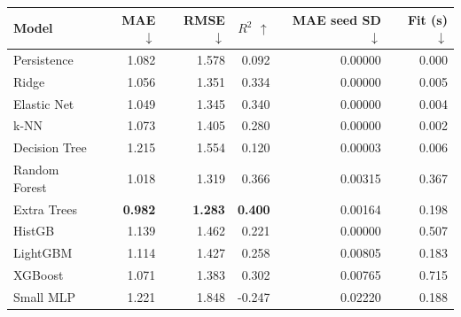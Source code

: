 \begingroup\small\setlength{\tabcolsep}{3pt}
\begin{tabular*}{\linewidth}{@{\extracolsep{\fill}}lrrrrr}
\toprule
Model & MAE $\downarrow$ & RMSE $\downarrow$ & $R^2$ $\uparrow$ & \shortstack{MAE seed\\SD $\downarrow$} & \shortstack{Fit (s)\\$\downarrow$}\\
\midrule
Persistence & 1.082 & 1.578 & 0.092 & 0.00000 & 0.000\\
Ridge & 1.056 & 1.351 & 0.334 & 0.00000 & 0.005\\
Elastic Net & 1.049 & 1.345 & 0.340 & 0.00000 & 0.004\\
k-NN & 1.073 & 1.405 & 0.280 & 0.00000 & 0.002\\
Decision Tree & 1.215 & 1.554 & 0.120 & 0.00003 & 0.006\\
Random Forest & 1.018 & 1.319 & 0.366 & 0.00315 & 0.367\\
Extra Trees & \textbf{0.982} & \textbf{1.283} & \textbf{0.400} & 0.00164 & 0.198\\
HistGB & 1.139 & 1.462 & 0.221 & 0.00000 & 0.507\\
LightGBM & 1.114 & 1.427 & 0.258 & 0.00805 & 0.183\\
XGBoost & 1.071 & 1.383 & 0.302 & 0.00765 & 0.715\\
Small MLP & 1.221 & 1.848 & -0.247 & 0.02220 & 0.188\\
\bottomrule
\end{tabular*}\endgroup
